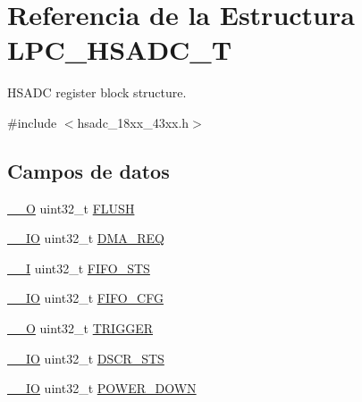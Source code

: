 \hypertarget{struct_l_p_c___h_s_a_d_c___t}{}\section{Referencia de la Estructura L\+P\+C\+\_\+\+H\+S\+A\+D\+C\+\_\+T}
\label{struct_l_p_c___h_s_a_d_c___t}


H\+S\+A\+DC register block structure.  




{\ttfamily \#include $<$hsadc\+\_\+18xx\+\_\+43xx.\+h$>$}

\subsection*{Campos de datos}
\begin{DoxyCompactItemize}
\item 
\hyperlink{core__sc300_8h_a7e25d9380f9ef903923964322e71f2f6}{\+\_\+\+\_\+O} uint32\+\_\+t \hyperlink{struct_l_p_c___h_s_a_d_c___t_a65711c46739bd87210a31ee2f03fe98d}{F\+L\+U\+SH}
\item 
\hyperlink{core__sc300_8h_aec43007d9998a0a0e01faede4133d6be}{\+\_\+\+\_\+\+IO} uint32\+\_\+t \hyperlink{struct_l_p_c___h_s_a_d_c___t_ad169f4e0f80023331a1f07bf82057567}{D\+M\+A\+\_\+\+R\+EQ}
\item 
\hyperlink{core__sc300_8h_af63697ed9952cc71e1225efe205f6cd3}{\+\_\+\+\_\+I} uint32\+\_\+t \hyperlink{struct_l_p_c___h_s_a_d_c___t_a3a20d13547494126da81a3570cb32b21}{F\+I\+F\+O\+\_\+\+S\+TS}
\item 
\hyperlink{core__sc300_8h_aec43007d9998a0a0e01faede4133d6be}{\+\_\+\+\_\+\+IO} uint32\+\_\+t \hyperlink{struct_l_p_c___h_s_a_d_c___t_ae7b9e6d15e87f6d9bbafc1dfa68e0c4e}{F\+I\+F\+O\+\_\+\+C\+FG}
\item 
\hyperlink{core__sc300_8h_a7e25d9380f9ef903923964322e71f2f6}{\+\_\+\+\_\+O} uint32\+\_\+t \hyperlink{struct_l_p_c___h_s_a_d_c___t_a5d002b61de3373d6bec5da6bc4ad4bcc}{T\+R\+I\+G\+G\+ER}
\item 
\hyperlink{core__sc300_8h_aec43007d9998a0a0e01faede4133d6be}{\+\_\+\+\_\+\+IO} uint32\+\_\+t \hyperlink{struct_l_p_c___h_s_a_d_c___t_a26cbdcf69ad16a1c1d49fbe2ef334a84}{D\+S\+C\+R\+\_\+\+S\+TS}
\item 
\hyperlink{core__sc300_8h_aec43007d9998a0a0e01faede4133d6be}{\+\_\+\+\_\+\+IO} uint32\+\_\+t \hyperlink{struct_l_p_c___h_s_a_d_c___t_a66a06f743e4b9dd8a59503fd111e42e5}{P\+O\+W\+E\+R\+\_\+\+D\+O\+WN}
\item 

\end{DoxyCompactItemize}
